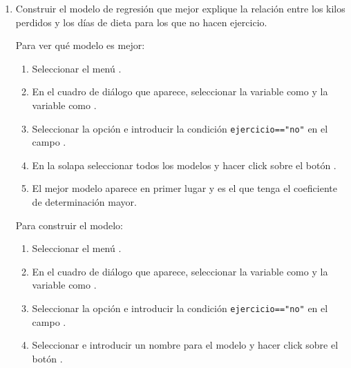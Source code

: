 \begin{enumerate}[leftmargin=*]
\begin{enumerate}
\item Construir el modelo de regresión que mejor explique la relación entre los kilos perdidos y los días de dieta para
los que no hacen ejercicio.
\begin{indicacion}{
Para ver qué modelo es mejor:
\begin{enumerate}
\item Seleccionar el menú .
\item En el cuadro de diálogo que aparece, seleccionar la variable  como 
y la variable  como .
\item Seleccionar la opción  e introducir la condición \lstinline{ejercicio=="no"} en el campo .
\item En la solapa  seleccionar todos los modelos y hacer click sobre el botón .
\item El mejor modelo aparece en primer lugar y es el que tenga el coeficiente de determinación mayor.
\end{enumerate}
Para construir el modelo:
\begin{enumerate}
\item Seleccionar el menú .
\item En el cuadro de diálogo que aparece, seleccionar la variable  como 
y la variable  como .
\item Seleccionar la opción  e introducir la condición \lstinline{ejercicio=="no"} en el campo .
\item Seleccionar  e introducir un nombre para el modelo y hacer click sobre el botón .
\end{enumerate}}
\end{indicacion}


\end{enumerate}
\end{enumerate}
